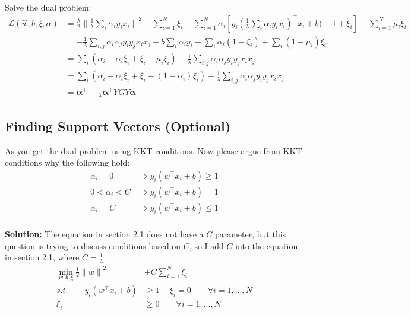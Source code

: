 \documentclass[a4paper]{article}
\begin{document}
Solve the dual problem:
\begin{equation}
    \begin{aligned}
        \mathcal{L}(\hat{w},b,\xi,\alpha)  &=  \frac{\lambda}{2}{\| \frac{1}{\lambda} \sum_{i} \alpha_i y_i x_i \|}^2 + \sum_{i=1}^{N} \xi_i - \sum_{i=1}^{N} \alpha_i [y_i (\frac{1}{\lambda} \sum_{i} \alpha_i y_i x_i )^{\top} x_i + b) - 1+\xi_i] - \sum_{i=1}^{N} \mu_i \xi_i \\
        &= - \frac{1}{\lambda}\sum_{i,j}\alpha_i \alpha_j y_i y_j x_i x_j - b \sum_{i}\alpha_i y_i + \sum_{i}\alpha_i (1-\xi_i) + \sum_{i} (1-\mu_i)\xi_i ,\\
        &= \sum_{i}(\alpha_i -\alpha_i\xi_i +\xi_i - \mu_i \xi_i) - \frac{1}{\lambda}\sum_{i,j}\alpha_i \alpha_j y_i y_j x_i x_j \\
        &= \sum_{i}(\alpha_i -\alpha_i\xi_i +\xi_i - (1-\alpha_i) \xi_i) - \frac{1}{\lambda}\sum_{i,j}\alpha_i \alpha_j y_i y_j x_i x_j \\
        &= \pmb{\alpha}^{\top}  -  \frac{1}{\lambda} \pmb{\alpha}^{\top} Y G Y \pmb{\alpha}
    \end{aligned}
\end{equation}


\subsection{Finding Support Vectors (Optional)}
As you get the dual problem using KKT conditions. Now please argue from KKT conditions why the following hold:
\begin{equation}
    \begin{aligned}
        \alpha_i=0 &\Rightarrow  y_i(w^{\top}x_i+b) \ge 1 \\
        0 < \alpha_i < C &\Rightarrow  y_i(w^{\top}x_i+b) = 1 \\
        \alpha_i=C &\Rightarrow  y_i(w^{\top}x_i+b) \le 1 \\
    \end{aligned}
\end{equation}

\textbf{Solution:} The equation in section 2.1 does not have a $C$ parameter, but this question is trying to discuss conditions based on $C$, so I add $C$ into the equation in section 2.1, where $C=\frac{1}{\lambda}$
\begin{equation}
    \begin{aligned}
        \min_{w, b, \xi}    \frac{1}{2}{\|w\|}^2 &+ C \sum_{i=1}^{N} \xi_i \\
        s.t.\qquad  y_i(w^{\top} x_i + b) &\ge 1- \xi_i =0 \qquad \forall i =1,...,N\\
        \xi_i &\ge 0 \qquad \forall i =1,...,N
    \end{aligned}
\end{equation}
\end{document}
